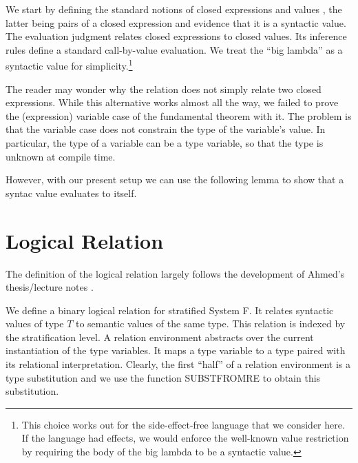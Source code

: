 \documentclass[acmsmall,anonymous,review,screen]{acmart}
\begin{document}
We start by defining the
standard notions of closed expressions {\ACExpr} and values {\AValue}, the latter being
pairs of a closed expression and evidence {\AisValue} that it is a syntactic value.
\BigStepCExpr
\BigStepisValue
\BigStepValue
The evaluation judgment relates closed expressions to closed values.
Its inference rules define a standard call-by-value evaluation.
We treat the ``big lambda'' as a syntactic value for
simplicity.\footnote{This choice works out for the
  side-effect-free language that we consider here. If the language had
  effects, we would enforce the well-known value restriction by
  requiring the body of the big lambda to be a syntactic value.}
\BigStepSemantics

The reader may wonder why the relation does not simply relate two closed
expressions. While this alternative works almost all the way, we
failed to prove the (expression) variable case of the fundamental theorem with
it. The problem is that the variable case does not constrain the type
of the variable's value. In particular, the type of a variable can be
a type variable, so that the type is unknown at compile time.

However, with our present setup we can use the following lemma to show
that a syntac value evaluates to itself.
\BigStepValueReduceSelf

\section{Logical Relation}
\label{sec:logical-relation}

The definition of the logical relation largely follows the development
of Ahmed's thesis/lecture notes \cite{AhmedLR}. 

We define a binary logical relation for stratified System F. It
relates syntactic values of type $T$ to semantic values of the same
type. This relation {\AREL} is indexed by the stratification level.
\LogicalREL
A relation environment {\ARelEnv} abstracts over the current instantiation of the
type variables. It maps a type variable to a
type paired with its relational interpretation. 
\LogicalRelEnv
Clearly, the first ``half'' of a relation environment is a type
substitution and we use the function SUBSTFROMRE to obtain this
substitution.
\end{document}
